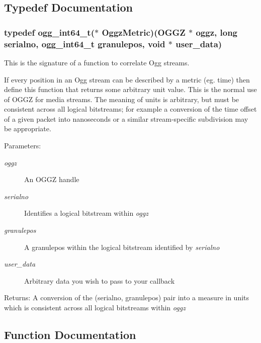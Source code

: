 \subsection{Typedef Documentation}
\subsubsection{\setlength{\rightskip}{0pt plus 5cm}typedef ogg\_\-int64\_\-t($\ast$ {\bf Oggz\-Metric})({\bf OGGZ} $\ast$ oggz, long serialno, ogg\_\-int64\_\-t granulepos, void $\ast$ user\_\-data)}\label{group__seeking__group_a0}


This is the signature of a function to correlate Ogg streams. 

If every position in an Ogg stream can be described by a metric (eg. time) then define this function that returns some arbitrary unit value. This is the normal use of OGGZ for media streams. The meaning of units is arbitrary, but must be consistent across all logical bitstreams; for example a conversion of the time offset of a given packet into nanoseconds or a similar stream-specific subdivision may be appropriate.

\begin{Desc}
\item[Parameters:]
\begin{description}
\item[{\em oggz}]An OGGZ handle \item[{\em serialno}]Identifies a logical bitstream within {\em oggz\/} \item[{\em granulepos}]A granulepos within the logical bitstream identified by {\em serialno\/} \item[{\em user\_\-data}]Arbitrary data you wish to pass to your callback \end{description}
\end{Desc}
\begin{Desc}
\item[Returns:]A conversion of the (serialno, granulepos) pair into a measure in units which is consistent across all logical bitstreams within {\em oggz\/} \end{Desc}


\subsection{Function Documentation}
